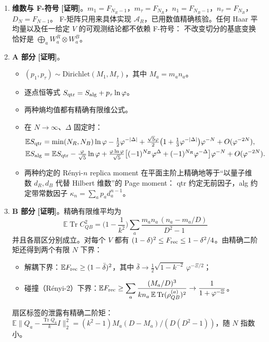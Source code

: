 \documentclass[11pt,a4paper,UTF8]{ctexart}
\newcommand{\Tr}{\operatorname{Tr}}
\newcommand{\E}{\mathbb{E}}
\newcommand{\Frec}{F_{\rm rec}}
\newcommand{\Salg}{S_{\rm alg}}
\newcommand{\Sqtr}{S_{\rm qtr}}
\newcommand{\tagP}{\texorpdfstring{\textcolor{cP}{\textbf{[证明]}}}{[证明]}}
\begin{document}
\begin{enumerate}[leftmargin=*,label=\textbf{\arabic*.}]
\item \textbf{维数与 F-符号} \tagP。$m_1=F_{N_R-1}$，$m_\tau=F_{N_R}$，$n_1=F_{N_B-1}$，$n_\tau=F_{N_B}$，$D_N=F_{N-1}$。
F-矩阵只用来具体实现 $\mathcal A_R$，已用数值精确核验。任何 Haar 平均量以及任一给定 $V$ 的可观测结论都不依赖 F-符号：
不改变切分的基底变换恰好是 $\bigoplus_a W^R_a\otimes W^B_a$。

\item \textbf{A 部分} \tagP。
\begin{itemize}
  \item $(p_1,p_\tau)\sim\mathrm{Dirichlet}(M_1,M_\tau)$，其中 $M_a=m_an_a$。
  \item 逐点恒等式 $\Sqtr=\Salg+p_\tau\ln\varphi$。
  \item 两种熵均值都有精确有限维公式。
  \item 在 $N\to\infty$、$\Delta$ 固定时：
  \begin{align*}
  \E\Sqtr&=\min(N_R,N_B)\ln\varphi-\tfrac12\varphi^{-|\Delta|}+\tfrac{\sqrt5\varphi}{2}\big(1+\tfrac13\varphi^{-|\Delta|}\big)\varphi^{-N}+O(\varphi^{-2N}),\\
  \E\Salg&=\E\Sqtr-\tfrac{\varphi}{\sqrt5}\ln\varphi
     +\tfrac{\varphi\ln\varphi}{\sqrt5}\big[(-1)^{N_B}\varphi^{\Delta}+(-1)^{N_R}\varphi^{-\Delta}\big]\varphi^{-N}+O(\varphi^{-2N}).
  \end{align*}
  \item 两种约定的 Rényi-$n$ replica moment 在平面主阶上精确地等于“以量子维数 $d_R,d_B$ 代替 Hilbert 维数”的 Page moment：
  qtr 约定无前因子，alg 约定带常数因子 $\kappa_n=\sum_ap_ad_a^{n-1}$。
\end{itemize}

\item \textbf{B 部分} \tagP。精确有限维平均为
\[
\boxed{\ \E\Tr C_{QB}^2=\Big(1-\frac1{k^2}\Big)\sum_a\frac{m_an_a\,(n_a-m_a/D)}{D^2-1}\ }
\]
并且各扇区分别成立。对每个 $V$ 都有 $(1-\delta)^2\le\Frec\le1-\delta^2/4$。由精确二阶矩还得到两个有限 $N$ 下界：
\begin{itemize}
  \item 解耦下界：$\E\Frec\ge(1-\bar\delta)^2$，其中 $\bar\delta\to\frac12\sqrt{1-k^{-2}}\,\varphi^{-\Xi/2}$；
  \item 碰撞（Rényi-2）下界：$\displaystyle\E\Frec\ge\sum_a\frac{(M_a/D)^3}{kn_a\,\E\Tr(\rho^{(a)}_{QB})^2}\to\frac{1}{1+\varphi^{-\Xi}}$。
\end{itemize}
扇区标签的泄露有精确二阶矩：$\E\big\|Q_a-\tfrac{\Tr Q_a}{k}I\big\|_2^2=(k^2-1)M_a(D-M_a)/(D(D^2-1))$，随 $N$ 指数小。


\end{enumerate}
\end{document}
